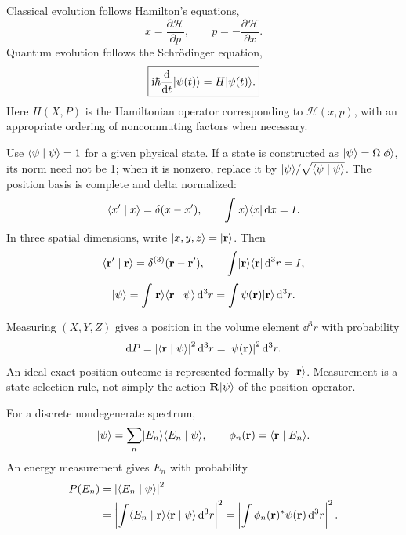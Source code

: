 Classical evolution follows Hamilton's equations,
\[
 \dot x=\frac{\partial\mathcal H}{\partial p},\qquad
 \dot p=-\frac{\partial\mathcal H}{\partial x}.
\]
Quantum evolution follows the Schr\"odinger equation,
\[
 \boxed{\mathrm{i}\hbar\frac{\mathop{}\!\mathrm{d}}{\mathop{}\!\mathrm{d} t}\lvert \psi(t)\rangle=H\lvert \psi(t)\rangle.}
\]
Here $H(X,P)$ is the Hamiltonian operator corresponding to
$\mathcal H(x,p)$, with an appropriate ordering of noncommuting
factors when necessary.

Use $\langle \psi\mid \psi\rangle=1$ for a given physical state. If a state is
constructed as $\lvert \psi\rangle=\Omega\lvert \phi\rangle$, its norm need not be 1;
when it is nonzero, replace it by
$\lvert \psi\rangle/\sqrt{\langle \psi\mid \psi\rangle}$.
The position basis is complete and delta normalized:
\[
 \langle x'\mid x\rangle=\delta(x-x'),\qquad
 \int\lvert x\rangle\langle x\rvert\mathop{}\!\mathrm{d} x=I.
\]
In three spatial dimensions, write
$\lvert x,y,z\rangle=\lvert \mathbf r\rangle$. Then
\[
 \langle \mathbf r'\mid \mathbf r\rangle
 =\delta^{(3)}(\mathbf r-\mathbf r'),\qquad
 \int\lvert \mathbf r\rangle\langle \mathbf r\rvert\mathop{}\!\mathrm{d}^3r=I,
\]
\[
 \lvert \psi\rangle=\int\lvert \mathbf r\rangle\langle \mathbf r\mid \psi\rangle\mathop{}\!\mathrm{d}^3r
 =\int\psi(\mathbf r)\lvert \mathbf r\rangle\mathop{}\!\mathrm{d}^3r.
\]

Measuring $(X,Y,Z)$ gives a position in the volume element $\dd^3r$
with probability
\[
 \mathop{}\!\mathrm{d} P=\left\lvert\langle \mathbf r\mid \psi\rangle\right\rvert^2\mathop{}\!\mathrm{d}^3r
      =\left\lvert\psi(\mathbf r)\right\rvert^2\mathop{}\!\mathrm{d}^3r.
\]
An ideal exact-position outcome is represented formally by
$\lvert \mathbf r\rangle$. Measurement is a state-selection rule, not simply
the action $\mathbf R\lvert \psi\rangle$ of the position operator.

For a discrete nondegenerate spectrum,
\[
 \lvert \psi\rangle=\sum_n\lvert E_n\rangle\langle E_n\mid \psi\rangle,\qquad
 \phi_n(\mathbf r)=\langle \mathbf r\mid E_n\rangle.
\]
An energy measurement gives $E_n$ with probability
\begin{align*}
 P(E_n)&=\left\lvert\langle E_n\mid \psi\rangle\right\rvert^2\\
 &=\left\lvert\int\langle E_n\mid \mathbf r\rangle\langle \mathbf r\mid \psi\rangle\mathop{}\!\mathrm{d}^3r\right\rvert^2
 =\left\lvert\int\phi_n(\mathbf r)^*\psi(\mathbf r)\mathop{}\!\mathrm{d}^3r\right\rvert^2.
\end{align*}
